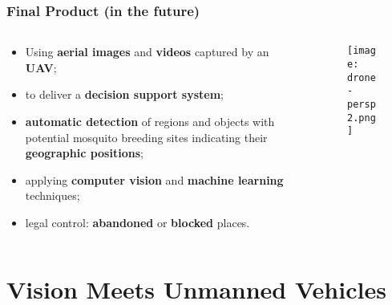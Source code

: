 \documentclass{beamer}
\begin{document}
		\begin{frame}
			\frametitle{Final Product (in the future)}

			\begin{columns}
				\begin{column}{0.55\linewidth}
					\begin{itemize}
						\item Using {\bf aerial images} and {\bf videos} captured by an {\bf UAV};
						\item to deliver a \textbf{decision support system}; %
						\item {\bf automatic detection} of regions and objects with {potential mosquito breeding sites}
						indicating their \textbf{geographic positions}; %
						\item applying {\bf computer vision} and {\bf machine learning} techniques;
						\item legal control: \textbf{abandoned} or \textbf{blocked} places.
					\end{itemize}
				\end{column}
				\begin{column}{0.45\linewidth}
					\begin{figure}[htb]
						\centering
						\texttt{[image: drone-persp2.png]}
						\label{fig:zframer1}
					\end{figure}

				\end{column}
			\end{columns}
		\end{frame}

\section{Vision Meets Unmanned Vehicles}

\end{document}
